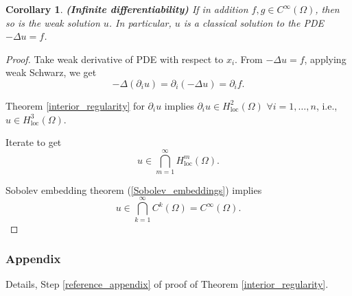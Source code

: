 \documentclass[12pt]{article}
\newtheorem{corollary}{Corollary}[section]
\theoremstyle{definition}
\begin{document}
\begin{corollary}
\emph{\textbf{(Infinite differentiability)}} If in addition $f,g\in C^{\infty}(\Omega)$, then so is the weak solution $u$. In particular, $u$ is a classical solution to the PDE $-\Delta u=f$.
\end{corollary}

\begin{proof}
Take weak derivative of PDE with respect to $x_i$. From $-\Delta u=f$, applying weak Schwarz, we get
\[-\Delta(\partial_iu)=\partial_i(-\Delta u)=\partial_if.\]

Theorem \ref{interior_regularity} for $\partial_iu$ implies $\partial_iu\in H_{\text{loc}}^2(\Omega)$ $\forall i=1,\ldots,n$, i.e., $u\in H_{\text{loc}}^3(\Omega)$.

Iterate to get
\[u\in\bigcap_{m=1}^{\infty}H_{\text{loc}}^m(\Omega).\]

Sobolev embedding theorem (\ref{Sobolev_embeddings}) implies
\[u\in\bigcap_{k=1}^{\infty}C^k(\Omega)=C^{\infty}(\Omega).\]
\end{proof}

\subsubsection*{Appendix}
Details, Step \ref{reference_appendix} of proof of Theorem \ref{interior_regularity}.
\end{document}

